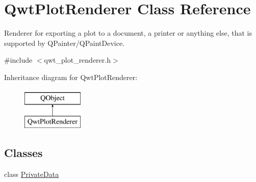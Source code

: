 \hypertarget{class_qwt_plot_renderer}{\section{Qwt\-Plot\-Renderer Class Reference}
\label{class_qwt_plot_renderer}
}


Renderer for exporting a plot to a document, a printer or anything else, that is supported by Q\-Painter/\-Q\-Paint\-Device.  




{\ttfamily \#include $<$qwt\-\_\-plot\-\_\-renderer.\-h$>$}

Inheritance diagram for Qwt\-Plot\-Renderer\-:\begin{figure}[H]
\begin{center}
\leavevmode
\includegraphics[height=2.000000cm]{class_qwt_plot_renderer}
\end{center}
\end{figure}
\subsection*{Classes}
\begin{DoxyCompactItemize}
\item 
class \hyperlink{class_qwt_plot_renderer_1_1_private_data}{Private\-Data}
\end{DoxyCompactItemize}
